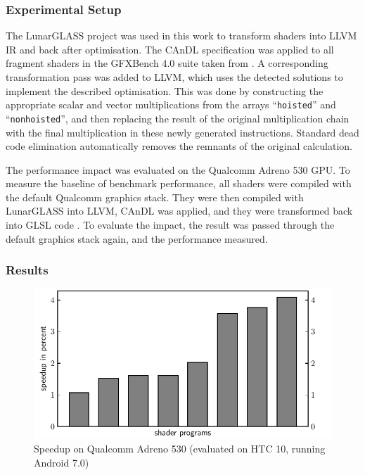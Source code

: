 \subsubsection{Experimental Setup}

    The LunarGLASS project \citep{lunarglass} was used in this work to
    transform shaders into LLVM IR and back after optimisation.
    The CAnDL specification was applied to all fragment shaders in the
    GFXBench 4.0 suite taken from \citet{gfxbench}.
    A corresponding transformation pass was added to LLVM, which uses the
    detected solutions to implement the described optimisation.
    This was done by constructing the appropriate scalar and vector
    multiplications from the arrays ``{\tt hoisted}'' and ``{\tt nonhoisted}'',
    and then replacing the result of the original multiplication chain with the
    final multiplication in these newly generated instructions.
    Standard dead code elimination automatically removes the remnants of the
    original calculation.

    The performance impact was evaluated on the Qualcomm Adreno 530 GPU.
    To measure the baseline of benchmark performance, all shaders were
    compiled with the default Qualcomm graphics stack.
    They were then compiled with LunarGLASS into LLVM, CAnDL was applied, and
    they were transformed back into GLSL code \citep{Rost:2009:OSL:1696393}.
    To evaluate the impact, the result was passed through the default graphics
    stack again, and the performance measured.

\subsubsection{Results}

\begin{figure}[t]
\centering
\includegraphics[width=0.66\linewidth]{figures/qualcomm_plot.pdf}
\caption{Speedup on Qualcomm Adreno 530 (evaluated on HTC 10, running Android 7.0)
         \leftskip=0pt\rightskip=0pt}
\label{fig:qualcommspeedup}
\end{figure}

